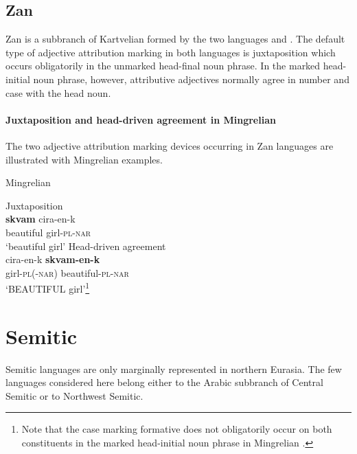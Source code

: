\subsection{Zan}
Zan is a subbranch of Kartvelian formed by the two languages  and . The default type of adjective attribution marking in both languages is juxtaposition which occurs obligatorily in the unmarked head-final noun phrase. In the marked head-initial noun phrase, however, attributive adjectives normally agree in number and case with the head noun.

\paragraph{Juxtaposition and head-driven agreement in Mingrelian}
The two adjective attribution marking devices occurring in Zan languages are illustrated with Mingrelian examples.
\begin{exe}
\ex \rm{Mingrelian \citep[361–364]{harris1991b}}
\begin{xlist}
\label{mingrelian juxt}
\ex \rm{Juxtaposition}\\
\gll	\textbf{skvam} cira-en-k\\
	beautiful girl-\textsc{pl}-\textsc{nar}\\
\glt	‘beautiful girl’%
\label{mingrelian agr}
\ex \rm{Head-driven agreement}\\
\gll	cira-en-k \textbf{skvam-en-k}\\
	girl-\textsc{pl}(-\textsc{nar}) beautiful-\textsc{pl}-\textsc{nar}\\
\glt	‘BEAUTIFUL girl’\footnote{Note that the case marking formative does not obligatorily occur on both constituents in the marked head-initial noun phrase in Mingrelian \citep[363–364]{harris1991b}.}%
\end{xlist}
\end{exe}

\section{Semitic}
Semitic languages are only marginally represented in northern Eurasia. The few languages considered here belong either to the Arabic subbranch of Central Semitic or to Northwest Semitic.

